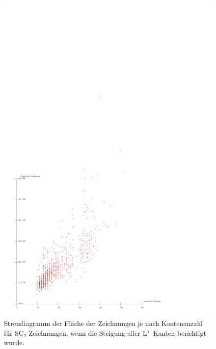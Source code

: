 \documentclass[a4paper]{scrreprt}
\theoremstyle{definition}
\begin{document}
\begin{figure}[p]
  \centering
  \includegraphics[width=\textwidth]{plots/smooth-noOpti}
  \caption{Streudiagramm der Fläche der Zeichnungen je nach Kontenanzahl für SC$_2$-Zeichnungen, wenn die Steigung aller L"~Kanten berichtigt wurde.}
  \label{fig:smooth-noOpti}
\end{figure}
\end{document}
